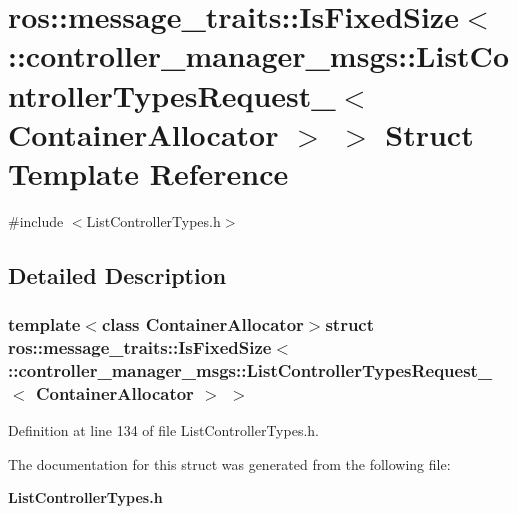 \section{ros\-:\-:message\-\_\-traits\-:\-:\-Is\-Fixed\-Size$<$ \-:\-:controller\-\_\-manager\-\_\-msgs\-:\-:\-List\-Controller\-Types\-Request\-\_\-$<$ \-Container\-Allocator $>$ $>$ \-Struct \-Template \-Reference}
\label{structros_1_1message__traits_1_1IsFixedSize_3_01_1_1controller__manager__msgs_1_1ListControllerTb837cb625a7e03f1ec5da93563e5282d}


{\ttfamily \#include $<$\-List\-Controller\-Types.\-h$>$}



\subsection{\-Detailed \-Description}
\subsubsection*{template$<$class Container\-Allocator$>$struct ros\-::message\-\_\-traits\-::\-Is\-Fixed\-Size$<$ \-::controller\-\_\-manager\-\_\-msgs\-::\-List\-Controller\-Types\-Request\-\_\-$<$ Container\-Allocator $>$ $>$}



\-Definition at line 134 of file \-List\-Controller\-Types.\-h.



\-The documentation for this struct was generated from the following file\-:\begin{DoxyCompactItemize}
\item 
{\bf \-List\-Controller\-Types.\-h}\end{DoxyCompactItemize}
